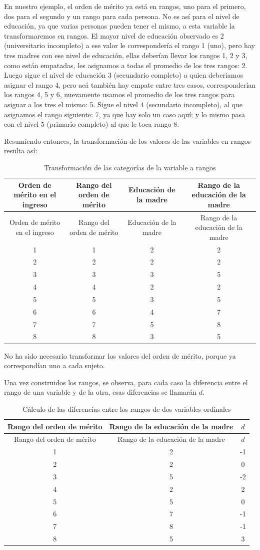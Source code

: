 \documentclass[]{book}
\begin{document}
En nuestro ejemplo, el orden de mérito ya está en rangos, uno para el
primero, dos para el segundo y un rango para cada persona. No es así
para el nivel de educación, ya que varias personas pueden tener el
mismo, a esta variable la transformaremos en rangos. El mayor nivel de
educación observado es 2 (universitario incompleto) a ese valor le
correspondería el rango 1 (uno), pero hay tres madres con ese nivel de
educación, ellas deberían llevar los rangos 1, 2 y 3, como están
empatadas, les asignamos a todas el promedio de los tres rangos: 2.
Luego sigue el nivel de educación 3 (secundario completo) a quien
deberíamos asignar el rango 4, pero acá también hay empate entre tres
casos, corresponderían los rangos 4, 5 y 6, nuevamente usamos el
promedio de los tres rangos para asignar a los tres el mismo: 5. Sigue
el nivel 4 (secundario incompleto), al que asignamos el rango siguiente:
7, ya que hay solo un caso aquí; y lo mismo pasa con el nivel 5
(primario completo) al que le toca rango 8.

Resumiendo entonces, la transformación de los valores de las variables
en rangos resulta así:

\begin{longtable}[]{@{}cccc@{}}
\caption{\label{tab:unnamed-chunk-142}Transformación de las categorías de la variable a rangos}\tabularnewline
\toprule
Orden de mérito en el ingreso & Rango del orden de mérito & Educación de la madre & Rango de la educación de la madre\tabularnewline
\midrule
\endfirsthead
\toprule
Orden de mérito en el ingreso & Rango del orden de mérito & Educación de la madre & Rango de la educación de la madre\tabularnewline
\midrule
\endhead
1 & 1 & 2 & 2\tabularnewline
2 & 2 & 2 & 2\tabularnewline
3 & 3 & 3 & 5\tabularnewline
4 & 4 & 2 & 2\tabularnewline
5 & 5 & 3 & 5\tabularnewline
6 & 6 & 4 & 7\tabularnewline
7 & 7 & 5 & 8\tabularnewline
8 & 8 & 3 & 5\tabularnewline
\bottomrule
\end{longtable}

No ha sido necesario transformar los valores del orden de mérito, porque ya correspondían uno a cada sujeto.

Una vez construidos los rangos, se observa, para cada caso la diferencia
entre el rango de una variable y de la otra, esas diferencias se
llamarán \(d\).

\begin{longtable}[]{@{}ccc@{}}
\caption{\label{tab:unnamed-chunk-143}Cálculo de las diferencias entre los rangos de dos variables ordinales}\tabularnewline
\toprule
Rango del orden de mérito & Rango de la educación de la madre & \(d\)\tabularnewline
\midrule
\endfirsthead
\toprule
Rango del orden de mérito & Rango de la educación de la madre & \(d\)\tabularnewline
\midrule
\endhead
1 & 2 & -1\tabularnewline
2 & 2 & 0\tabularnewline
3 & 5 & -2\tabularnewline
4 & 2 & 2\tabularnewline
5 & 5 & 0\tabularnewline
6 & 7 & -1\tabularnewline
7 & 8 & -1\tabularnewline
8 & 5 & 3\tabularnewline
\bottomrule
\end{longtable}
\end{document}
